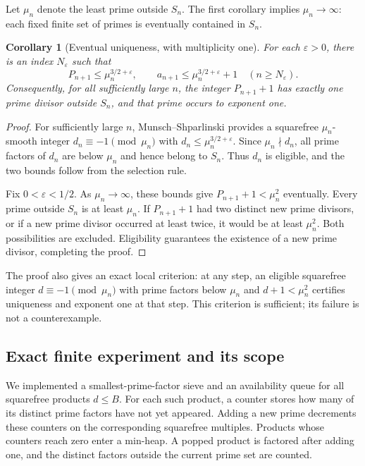 \documentclass[11pt,a4paper]{article}
\newtheorem{corollary}[theorem]{Corollary}
\theoremstyle{definition}\newtheorem{definition}[theorem]{Definition}
\theoremstyle{remark}\newtheorem{remark}[theorem]{Remark}
\begin{document}
Let $\mu_n$ denote the least prime outside $S_n$.  The first corollary implies
$\mu_n\to\infty$: each fixed finite set of primes is eventually contained
in $S_n$.

\begin{corollary}[Eventual uniqueness, with multiplicity one]
For each $\varepsilon>0$, there is an index $N_\varepsilon$ such that
\[
 P_{n+1}\le \mu_n^{3/2+\varepsilon},\qquad
 a_{n+1}\le \mu_n^{3/2+\varepsilon}+1
 \quad(n\ge N_\varepsilon).
\]
Consequently, for all sufficiently large $n$, the integer $P_{n+1}+1$
has exactly one prime divisor outside $S_n$, and that prime occurs to
exponent one.

\end{corollary}\begin{proof}
For sufficiently large $n$, Munsch--Shparlinski provides a squarefree
$\mu_n$-smooth integer $d_n\equiv-1\pmod{\mu_n}$ with
$d_n\le \mu_n^{3/2+\varepsilon}$.  Since $\mu_n\nmid d_n$, all prime
factors of $d_n$ are below $\mu_n$ and hence belong to $S_n$.
Thus $d_n$ is eligible, and the two bounds follow from the selection rule.

Fix $0<\varepsilon<1/2$.  As $\mu_n\to\infty$, these bounds give
$P_{n+1}+1<\mu_n^2$ eventually.  Every prime outside $S_n$ is at least
$\mu_n$.  If $P_{n+1}+1$ had two distinct new prime divisors, or if a new
prime divisor occurred at least twice, it would be at least $\mu_n^2$.
Both possibilities are excluded.  Eligibility guarantees the existence
of a new prime divisor, completing the proof.\end{proof}

The proof also gives an exact local criterion: at any step, an eligible
squarefree integer $d\equiv-1\pmod{\mu_n}$ with prime factors below $\mu_n$
and $d+1<\mu_n^2$ certifies uniqueness and exponent one at that step.
This criterion is sufficient; its failure is not a counterexample.

\subsection{Exact finite experiment and its scope}

We implemented a smallest-prime-factor sieve and an availability queue for
all squarefree products $d\le B$.  For each such product, a counter stores
how many of its distinct prime factors have not yet appeared.  Adding a
new prime decrements these counters on the corresponding squarefree
multiples.  Products whose counters reach zero enter a min-heap.  A
popped product is factored after adding one, and the distinct factors
outside the current prime set are counted.
\end{document}
